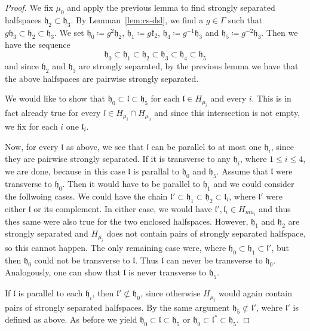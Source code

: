 \begin{proof}
  We fix \(\mu_0\) and apply the previous lemma to find strongly separated halfspaces \(\mathfrak{h_2} \subset \mathfrak{h_3}\). By Lemman~\ref{lem:cs-dsl}, we find a \(g \in \Gamma\) such that \(g\mathfrak{h}_3 \subset \mathfrak{h}_2 \subset \mathfrak{h}_3\). We set \(\mathfrak{h}_0 \coloneqq g^2 \mathfrak{h}_2\), \(\mathfrak{h}_1 \coloneqq g\mathfrak{k}_2\), \(\mathfrak{h}_4 \coloneqq g^{-1}\mathfrak{h}_3\) and \(\mathfrak{h}_5 \coloneqq g^{-2} \mathfrak{h}_3\). Then we have the sequence
  \[
    \mathfrak{h}_0 \subset \mathfrak{h}_1 \subset \mathfrak{h}_2 \subset \mathfrak{h}_3 \subset \mathfrak{h}_4 \subset \mathfrak{h}_5
  \]
  and since \(\mathfrak{h}_2\) and \(\mathfrak{h}_3\) are strongly separated, by the previous lemma we have that the above halfspaces are pairwise strongly separated.

  We would like to show that \(\mathfrak{h}_0 \subset \mathfrak{l} \subset \mathfrak{h}_5\) for each \(\mathfrak{l} \in H_{\mu_i}\) and every \(i\). This is in fact already true for every \(l \in H_{\mu_i} \cap H_{\mu_0}\) and since this intersection is not empty, we fix for each \(i\) one \(\mathfrak{l}_i\).

  Now, for every \(\mathfrak{l}\) as above, we see that \(\mathfrak{l}\) can be parallel to at most one \(\mathfrak{h}_i\), since they are pairwise strongly separated. If it is transverse to any \(\mathfrak{h}_i\), where \(1 \leq i \leq 4\), we are done, because in this case \(\mathfrak{l}\) is parallal to \(\mathfrak{h}_0\) and \(\mathfrak{h}_5\). Assume that \(\mathfrak{l}\) were transverse to \(\mathfrak{h}_0\). Then it would have to be parallel to \(\mathfrak{h}_1\) and we could consider the follwoing cases. We could have the chain \(\mathfrak{l}' \subset \mathfrak{h}_1 \subset \mathfrak{h}_2 \subset \mathfrak{l}_i\), where \(\mathfrak{l}'\) were either \(\mathfrak{l}\) or its complement. In either case, we would have \(\mathfrak{l}', \mathfrak{l}_i \in H_{mu_i}\) and thus thes same were also true for the two enclosed halfspaces. However, \(\mathfrak{h}_1\) and \(\mathfrak{h}_2\) are strongly separated and \(H_{\mu_i}\) does not contain pairs of strongly separated halfspace, so this cannot happen. The only remaining case were, where \(\mathfrak{h_0} \subset \mathfrak{h}_1 \subset \mathfrak{l}'\), but then \(\mathfrak{h}_0\) could not be transverse to \(\mathfrak{l}\). Thus \(\mathfrak{l}\) can never be transverse to \(\mathfrak{h}_0\). Analogously, one can show that \(\mathfrak{l}\) is never transverse to \(\mathfrak{h}_5\).

  If \(\mathfrak{l}\) is parallel to each \(\mathfrak{h}_i\), then \(\mathfrak{l}' \not\subset \mathfrak{h_0}\), since otherwise \(H_{\mu_i}\) would again contain pairs of strongly separated halfspaces. By the same argument \(\mathfrak{h}_5 \not\subset \mathfrak{l}'\), wehre \(\mathfrak{l}'\) is defined as above. As before we yield \(\mathfrak{h}_0 \subset \mathfrak{l} \subset \mathfrak{h}_5\) or \(\mathfrak{h}_0 \subset \mathfrak{l}^\ast \subset \mathfrak{h}_5\).
\end{proof}

